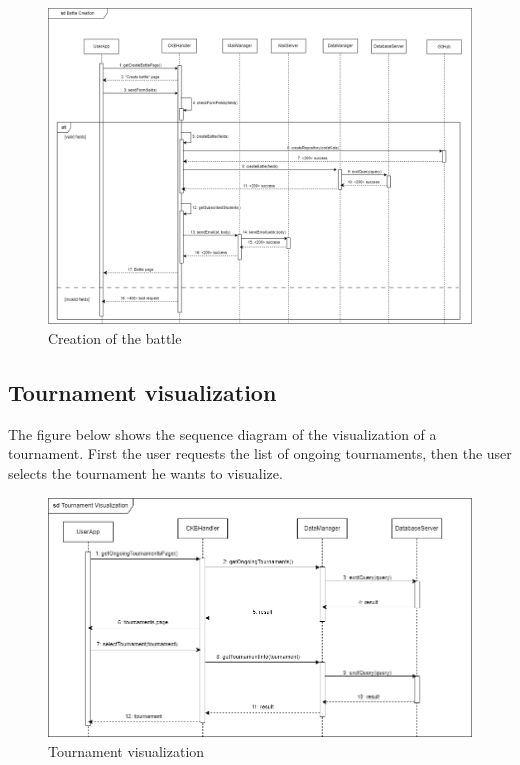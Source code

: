 \begin{figure}[H]
    \centering
    \includegraphics[width=1\textwidth]{images/seq_diagrams/battle_creation_DD.png}
    \caption{Creation of the battle}
\end{figure}
\clearpage

\subsection{Tournament visualization}
The figure below shows the sequence diagram of the visualization of a tournament. First the user requests the list of ongoing tournaments, 
then the user selects the tournament he wants to visualize.\\
\begin{figure}[H]
    \centering
    \includegraphics[width=1\textwidth]{images/seq_diagrams/tournament_visualization_dd.png}
    \caption{Tournament visualization}
\end{figure}
\clearpage

